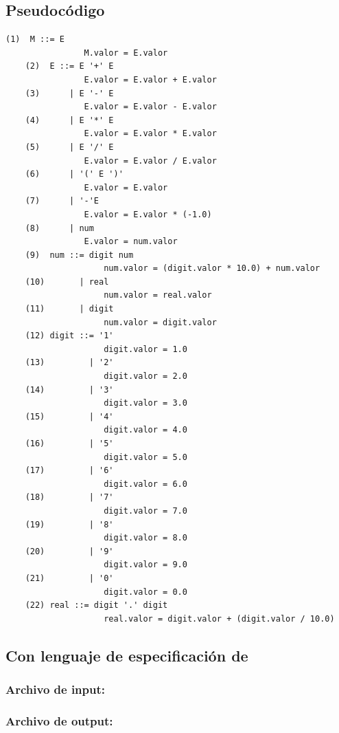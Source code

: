 \subsection{Pseudocódigo}
\begin{lstlisting}[backgroundcolor=\color{white}]
    (1)  M ::= E
                M.valor = E.valor
    (2)  E ::= E '+' E
                E.valor = E.valor + E.valor
    (3)      | E '-' E
                E.valor = E.valor - E.valor
    (4)      | E '*' E
                E.valor = E.valor * E.valor
    (5)      | E '/' E
                E.valor = E.valor / E.valor
    (6)      | '(' E ')'
                E.valor = E.valor
    (7)      | '-'E
                E.valor = E.valor * (-1.0)
    (8)      | num
                E.valor = num.valor
    (9)  num ::= digit num
                    num.valor = (digit.valor * 10.0) + num.valor
    (10)       | real
                    num.valor = real.valor
    (11)       | digit
                    num.valor = digit.valor
    (12) digit ::= '1'
                    digit.valor = 1.0
    (13)         | '2'
                    digit.valor = 2.0
    (14)         | '3'
                    digit.valor = 3.0
    (15)         | '4'
                    digit.valor = 4.0
    (16)         | '5'
                    digit.valor = 5.0
    (17)         | '6'
                    digit.valor = 6.0
    (18)         | '7'
                    digit.valor = 7.0
    (19)         | '8'
                    digit.valor = 8.0
    (20)         | '9'
                    digit.valor = 9.0
    (21)         | '0'
                    digit.valor = 0.0
    (22) real ::= digit '.' digit
                    real.valor = digit.valor + (digit.valor / 10.0)
\end{lstlisting} 

\subsection{Con lenguaje de especificación de \maggen}

\subsubsection{Archivo de input: }


\subsubsection{Archivo de output: }



